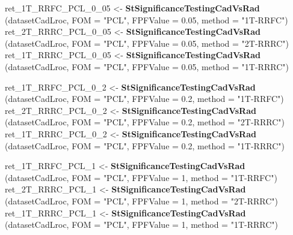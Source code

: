 \documentclass[
]{article}
\newenvironment{Shaded}{\begin{snugshade}}{\end{snugshade}}
\newcommand{\DataTypeTok}[1]{\textcolor[rgb]{0.13,0.29,0.53}{#1}}
\newcommand{\DecValTok}[1]{\textcolor[rgb]{0.00,0.00,0.81}{#1}}
\newcommand{\FloatTok}[1]{\textcolor[rgb]{0.00,0.00,0.81}{#1}}
\newcommand{\KeywordTok}[1]{\textcolor[rgb]{0.13,0.29,0.53}{\textbf{#1}}}
\newcommand{\NormalTok}[1]{#1}
\newcommand{\StringTok}[1]{\textcolor[rgb]{0.31,0.60,0.02}{#1}}
\begin{document}
\begin{Shaded}
\begin{Highlighting}[]

\NormalTok{ret\_1T\_RRFC\_PCL\_}\DecValTok{0}\NormalTok{\_}\DecValTok{05}\NormalTok{ \textless{}{-}}\StringTok{ }\KeywordTok{StSignificanceTestingCadVsRad}\NormalTok{ (datasetCadLroc, }
\DataTypeTok{FOM =} \StringTok{"PCL"}\NormalTok{, }\DataTypeTok{FPFValue =} \FloatTok{0.05}\NormalTok{, }\DataTypeTok{method =} \StringTok{"1T{-}RRFC"}\NormalTok{)}
\NormalTok{ret\_2T\_RRRC\_PCL\_}\DecValTok{0}\NormalTok{\_}\DecValTok{05}\NormalTok{ \textless{}{-}}\StringTok{ }\KeywordTok{StSignificanceTestingCadVsRad}\NormalTok{ (datasetCadLroc, }
\DataTypeTok{FOM =} \StringTok{"PCL"}\NormalTok{, }\DataTypeTok{FPFValue =} \FloatTok{0.05}\NormalTok{, }\DataTypeTok{method =} \StringTok{"2T{-}RRRC"}\NormalTok{)}
\NormalTok{ret\_1T\_RRRC\_PCL\_}\DecValTok{0}\NormalTok{\_}\DecValTok{05}\NormalTok{ \textless{}{-}}\StringTok{ }\KeywordTok{StSignificanceTestingCadVsRad}\NormalTok{ (datasetCadLroc, }
\DataTypeTok{FOM =} \StringTok{"PCL"}\NormalTok{, }\DataTypeTok{FPFValue =} \FloatTok{0.05}\NormalTok{, }\DataTypeTok{method =} \StringTok{"1T{-}RRRC"}\NormalTok{)}

\NormalTok{ret\_1T\_RRFC\_PCL\_}\DecValTok{0}\NormalTok{\_}\DecValTok{2}\NormalTok{ \textless{}{-}}\StringTok{ }\KeywordTok{StSignificanceTestingCadVsRad}\NormalTok{ (datasetCadLroc, }
\DataTypeTok{FOM =} \StringTok{"PCL"}\NormalTok{, }\DataTypeTok{FPFValue =} \FloatTok{0.2}\NormalTok{, }\DataTypeTok{method =} \StringTok{"1T{-}RRFC"}\NormalTok{)}
\NormalTok{ret\_2T\_RRRC\_PCL\_}\DecValTok{0}\NormalTok{\_}\DecValTok{2}\NormalTok{ \textless{}{-}}\StringTok{ }\KeywordTok{StSignificanceTestingCadVsRad}\NormalTok{ (datasetCadLroc, }
\DataTypeTok{FOM =} \StringTok{"PCL"}\NormalTok{, }\DataTypeTok{FPFValue =} \FloatTok{0.2}\NormalTok{, }\DataTypeTok{method =} \StringTok{"2T{-}RRRC"}\NormalTok{)}
\NormalTok{ret\_1T\_RRRC\_PCL\_}\DecValTok{0}\NormalTok{\_}\DecValTok{2}\NormalTok{ \textless{}{-}}\StringTok{ }\KeywordTok{StSignificanceTestingCadVsRad}\NormalTok{ (datasetCadLroc, }
\DataTypeTok{FOM =} \StringTok{"PCL"}\NormalTok{, }\DataTypeTok{FPFValue =} \FloatTok{0.2}\NormalTok{, }\DataTypeTok{method =} \StringTok{"1T{-}RRRC"}\NormalTok{)}

\NormalTok{ret\_1T\_RRFC\_PCL\_}\DecValTok{1}\NormalTok{ \textless{}{-}}\StringTok{ }\KeywordTok{StSignificanceTestingCadVsRad}\NormalTok{ (datasetCadLroc, }
\DataTypeTok{FOM =} \StringTok{"PCL"}\NormalTok{, }\DataTypeTok{FPFValue =} \DecValTok{1}\NormalTok{, }\DataTypeTok{method =} \StringTok{"1T{-}RRFC"}\NormalTok{)}
\NormalTok{ret\_2T\_RRRC\_PCL\_}\DecValTok{1}\NormalTok{ \textless{}{-}}\StringTok{ }\KeywordTok{StSignificanceTestingCadVsRad}\NormalTok{ (datasetCadLroc, }
\DataTypeTok{FOM =} \StringTok{"PCL"}\NormalTok{, }\DataTypeTok{FPFValue =} \DecValTok{1}\NormalTok{, }\DataTypeTok{method =} \StringTok{"2T{-}RRRC"}\NormalTok{)}
\NormalTok{ret\_1T\_RRRC\_PCL\_}\DecValTok{1}\NormalTok{ \textless{}{-}}\StringTok{ }\KeywordTok{StSignificanceTestingCadVsRad}\NormalTok{ (datasetCadLroc, }
\DataTypeTok{FOM =} \StringTok{"PCL"}\NormalTok{, }\DataTypeTok{FPFValue =} \DecValTok{1}\NormalTok{, }\DataTypeTok{method =} \StringTok{"1T{-}RRRC"}\NormalTok{)}


\end{Highlighting}
\end{Shaded}
\end{document}
